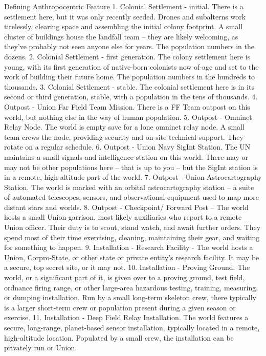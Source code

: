 Defining Anthropocentric Feature   
    1.  Colonial Settlement - initial. There is a settlement here, but it was only recently seeded.  
        Drones and subalterns work tirelessly, clearing space and assembling the initial colony  
        footprint. A small cluster of buildings house the landfall team -- they are likely welcoming,  
        as they’ve probably not seen anyone else for years. The population numbers in the  
        dozens.   
    2.  Colonial Settlement - first generation. The colony settlement here is young, with its first  
        generation of native-born colonists now of-age and set to the work of building their future  
        home. The population numbers in the hundreds to thousands.   
    3.  Colonial Settlement - stable. The colonial settlement here is in its second or third  
        generation, stable, with a population in the tens of thousands.   
    4.  Outpost - Union Far Field Team Mission. There is a FF Team outpost on this world, but  
        nothing else in the way of human population.   
    5.  Outpost - Omninet Relay Node. The world is empty save for a lone omninet relay node. A  
        small team crews the node, providing security and on-site technical support. They rotate  
        on a regular schedule.   
    6.  Outpost - Union Navy SigInt Station. The UN maintains a small signals and intelligence  
        station on this world. There may or may not be other populations here -- that is up to you --  
        but the SigInt station is in a remote, high-altitude part of the world.   
    7.  Outpost - Union Astrocartography Station. The world is marked with an orbital  
        astrocartography station -- a suite of automated telescopes, sensors, and observational  
        equipment used to map more distant stars and worlds.   
    8.  Outpost - Checkpoint/ Forward Post -- The world hosts a small Union garrison, most likely  
        auxiliaries who report to a remote Union officer. Their duty is to scout, stand watch, and  
        await further orders. They spend most of their time exercising, cleaning, maintaining their  
        gear, and waiting for something to happen.   
    9.  Installation - Research Facility - The world hosts a Union, Corpro-State, or other state or  
        private entity’s research facility. It may be a secure, top secret site, or it may not.   
    10. Installation - Proving Ground. The world, or a significant part of it, is given over to a  
        proving ground, test field, ordnance firing range, or other large-area hazardous testing,  
        training, measuring, or dumping installation. Run by a small long-term skeleton crew, there  
        typically is a larger short-term crew or population present during a given season or  
        exercise.   
    11. Installation - Deep Field Relay Installation. The world features a secure, long-range,  
        planet-based sensor installation, typically located in a remote, high-altitude location.  
        Populated by a small crew, the installation can be privately run or Union.   

